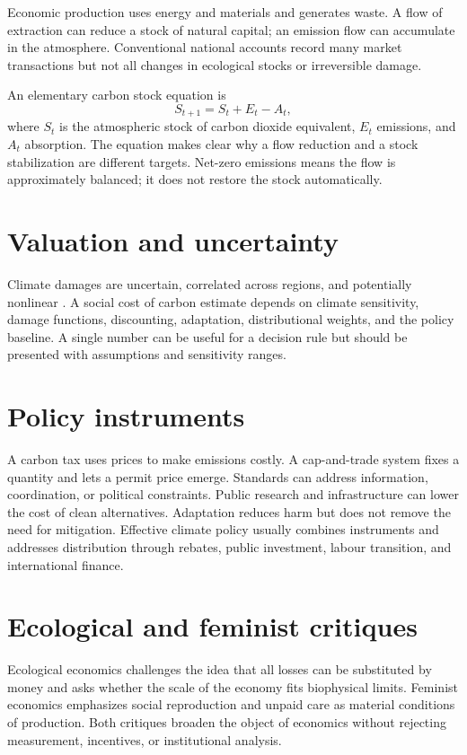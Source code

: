 \documentclass[11pt,oneside,openany]{book}
\begin{document}
Economic production uses energy and materials and generates waste. A flow of extraction can reduce a stock of natural capital; an emission flow can accumulate in the atmosphere. Conventional national accounts record many market transactions but not all changes in ecological stocks or irreversible damage.

An elementary carbon stock equation is
\[
  S_{t+1}=S_t+E_t-A_t,
\]
where $S_t$ is the atmospheric stock of carbon dioxide equivalent, $E_t$ emissions, and $A_t$ absorption. The equation makes clear why a flow reduction and a stock stabilization are different targets. Net-zero emissions means the flow is approximately balanced; it does not restore the stock automatically.

\section{Valuation and uncertainty}

Climate damages are uncertain, correlated across regions, and potentially nonlinear \cite{ipcc2023}. A social cost of carbon estimate depends on climate sensitivity, damage functions, discounting, adaptation, distributional weights, and the policy baseline. A single number can be useful for a decision rule but should be presented with assumptions and sensitivity ranges.

\section{Policy instruments}

A carbon tax uses prices to make emissions costly. A cap-and-trade system fixes a quantity and lets a permit price emerge. Standards can address information, coordination, or political constraints. Public research and infrastructure can lower the cost of clean alternatives. Adaptation reduces harm but does not remove the need for mitigation. Effective climate policy usually combines instruments and addresses distribution through rebates, public investment, labour transition, and international finance.

\section{Ecological and feminist critiques}

Ecological economics challenges the idea that all losses can be substituted by money and asks whether the scale of the economy fits biophysical limits. Feminist economics emphasizes social reproduction and unpaid care as material conditions of production. Both critiques broaden the object of economics without rejecting measurement, incentives, or institutional analysis.
\end{document}
